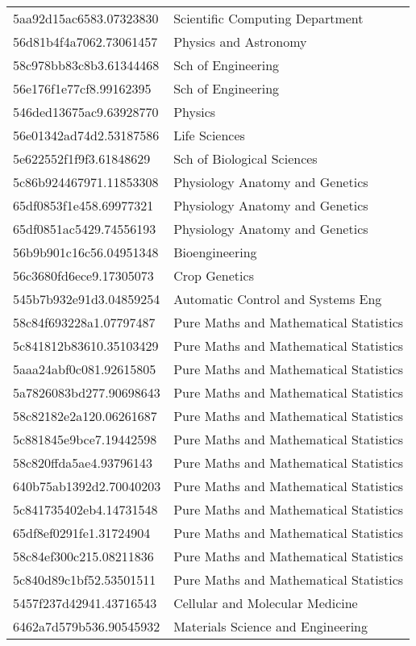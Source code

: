 \begin{tabular}{ll}
5aa92d15ac6583.07323830 & Scientific Computing Department \\
56d81b4f4a7062.73061457 & Physics and Astronomy \\
58c978bb83c8b3.61344468 & Sch of Engineering \\
56e176f1e77cf8.99162395 & Sch of Engineering \\
546ded13675ac9.63928770 & Physics \\
56e01342ad74d2.53187586 & Life Sciences \\
5e622552f1f9f3.61848629 & Sch of Biological Sciences \\
5c86b924467971.11853308 & Physiology Anatomy and Genetics \\
65df0853f1e458.69977321 & Physiology Anatomy and Genetics \\
65df0851ac5429.74556193 & Physiology Anatomy and Genetics \\
56b9b901c16c56.04951348 & Bioengineering \\
56c3680fd6ece9.17305073 & Crop Genetics \\
545b7b932e91d3.04859254 & Automatic Control and Systems Eng \\
58c84f693228a1.07797487 & Pure Maths and Mathematical Statistics \\
5c841812b83610.35103429 & Pure Maths and Mathematical Statistics \\
5aaa24abf0c081.92615805 & Pure Maths and Mathematical Statistics \\
5a7826083bd277.90698643 & Pure Maths and Mathematical Statistics \\
58c82182e2a120.06261687 & Pure Maths and Mathematical Statistics \\
5c881845e9bce7.19442598 & Pure Maths and Mathematical Statistics \\
58c820ffda5ae4.93796143 & Pure Maths and Mathematical Statistics \\
640b75ab1392d2.70040203 & Pure Maths and Mathematical Statistics \\
5c841735402eb4.14731548 & Pure Maths and Mathematical Statistics \\
65df8ef0291fe1.31724904 & Pure Maths and Mathematical Statistics \\
58c84ef300c215.08211836 & Pure Maths and Mathematical Statistics \\
5c840d89c1bf52.53501511 & Pure Maths and Mathematical Statistics \\
5457f237d42941.43716543 & Cellular and Molecular Medicine \\
6462a7d579b536.90545932 & Materials Science and Engineering \\

\end{tabular}
